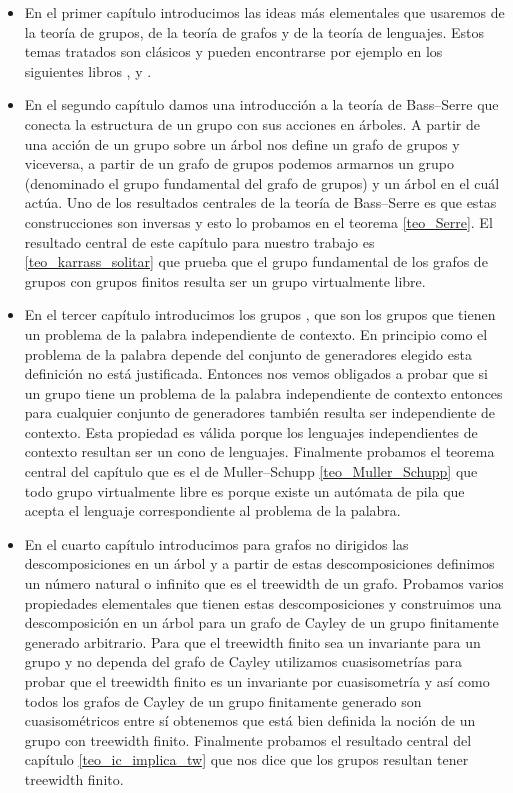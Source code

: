 \documentclass[tesis.tex]{subfiles}
\begin{document}
	\begin{itemize}
		\item 
			En el primer capítulo introducimos las ideas más elementales que usaremos de la teoría de grupos, de la teoría de grafos y de la teoría de lenguajes.
			Estos temas tratados son clásicos y pueden encontrarse por ejemplo en los siguientes libros \cite{lyndon1977combinatorial}, \cite{diestel2005graph} y \cite{hopcraft-ullman}.
		
		\item 
			En el segundo capítulo damos una introducción a la teoría de Bass--Serre que conecta la estructura de un grupo con sus acciones en árboles.
			A partir de una acción de un grupo sobre un árbol nos define un grafo de grupos y viceversa, a partir de un grafo de grupos podemos armarnos un grupo (denominado el grupo fundamental del grafo de grupos) y un árbol en el cuál actúa.
			Uno de los resultados centrales de la teoría de Bass--Serre es que estas construcciones son inversas y esto lo probamos en el teorema \ref{teo_Serre}.
			El resultado central de este capítulo para nuestro trabajo es \ref{teo_karrass_solitar} que prueba que el grupo fundamental de los grafos de grupos con grupos finitos resulta ser un grupo virtualmente libre.

		\item 
			En el tercer capítulo introducimos los grupos \ic, que son los grupos que tienen un problema de la palabra independiente de contexto. 
			En principio como el problema de la palabra depende del conjunto de generadores elegido esta definición no está justificada.
			Entonces nos vemos obligados a probar que si un grupo tiene un problema de la palabra independiente de contexto entonces para cualquier conjunto de generadores también resulta ser independiente de contexto.
			Esta propiedad es válida porque los lenguajes independientes de contexto resultan ser un cono de lenguajes.
			Finalmente probamos el teorema central del capítulo que es el de Muller--Schupp \ref{teo_Muller_Schupp} que todo grupo virtualmente libre es \ic porque existe un autómata de pila que acepta el lenguaje correspondiente al problema de la palabra. 
			
			
		
		\item 
			En el cuarto capítulo introducimos para grafos no dirigidos las descomposiciones en un árbol y a partir de estas descomposiciones definimos un número natural o infinito que es el treewidth de un grafo.
			Probamos varios propiedades elementales que tienen estas descomposiciones y construimos una descomposición en un árbol para un grafo de Cayley de un grupo finitamente generado arbitrario.
			Para que el treewidth finito sea un invariante para un grupo y no dependa del grafo de Cayley utilizamos cuasisometrías para probar que el treewidth finito es un invariante por cuasisometría y así como todos los grafos de Cayley de un grupo finitamente generado son cuasisométricos entre sí obtenemos que está bien definida la noción de un grupo con treewidth finito.
			Finalmente probamos el resultado central del capítulo \ref{teo_ic_implica_tw} que nos dice que los grupos \ic resultan tener treewidth finito.
			

\end{itemize}
\end{document}

